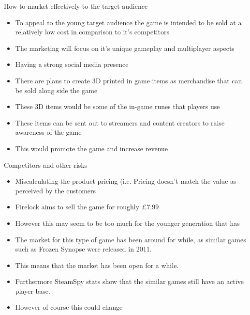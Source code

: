 \documentclass{beamer}
\begin{document}
\begin{frame}{How to market effectively to the target audience}
	 \pause
	\begin{itemize}
		\item To appeal to the young target audience the game is intended to be sold at a relatively low cost in comparison to it's competitors \pause
		\item The marketing will focus on it's unique gameplay and multiplayer aspects \pause
		\item Having a strong social media presence \pause
	\end{itemize}	
	
	 \pause
	\begin{itemize}
		\item There are plans to create 3D printed in game items as merchandise that can be sold along side the game \pause
		\item These 3D items would be some of the in-game runes that players use \pause
		\item These items can be sent out to streamers and content creators to raise awareness of the game \pause
		\item This would promote the game and increase revenue \pause
	\end{itemize}
	
	
\end{frame}

\begin{frame}{Competitors and other risks}
	\begin{itemize}
		\item Miscalculating the product pricing (i.e. Pricing doesn't match the value as perceived by the customers \pause
		\item Firelock aims to sell the game for roughly \pounds 7.99 \pause
		\item However this may seem to be too much for the younger generation that has

	\end{itemize}
	\begin {itemize}
		\item The market for this type of game has been around for while, as similar games such as Frozen Synapse were released in 2011. \pause
		\item This means that the market has been open for a while. \pause
		\item Furthermore SteamSpy stats show that the similar games still have an active player base. \pause %
		\item However of-course this could change \pause
	\end{itemize}
	

\end{frame}
\end{document}
